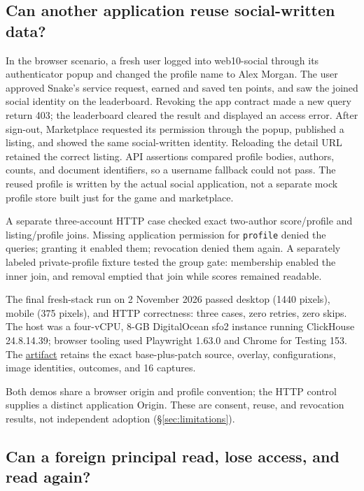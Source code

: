 \documentclass[sigconf, nonacm]{acmart}
\newcommand{\artifactbase}{https://github.com/jacoby149/web10}
\newcommand{\domainartifactrev}{26720acba859c7eb03fc5d26a6221cdde5b764a1}
\newcommand{\evidence}[2]{\href{\artifactbase/tree/\domainartifactrev/#1}{#2}}
\begin{document}
\subsection{Can another application reuse social-written data?}
\label{sec:ev-interop}

In the browser scenario, a fresh user logged into web10-social through
its authenticator popup and changed the profile name to Alex Morgan.
The user approved Snake's service request, earned and saved ten points,
and saw the joined social identity on the leaderboard. Revoking the app
contract made a new query return 403; the leaderboard cleared the result
and displayed an access error. After sign-out, Marketplace requested
its permission through the popup, published a listing, and showed the
same social-written identity. Reloading the detail URL retained the
correct listing. API assertions compared profile bodies, authors, counts,
and document identifiers, so a username fallback could not pass.
The reused profile is written by the actual social application, not a
separate mock profile store built just for the game and marketplace.

A separate three-account HTTP case checked exact two-author score/profile
and listing/profile joins. Missing application permission for
\texttt{profile} denied the queries; granting it enabled them; revocation
denied them again. A separately labeled private-profile fixture tested
the group gate: membership enabled the inner join, and removal emptied
that join while scores remained readable.

The final fresh-stack run on 2 November 2026 passed desktop (1440 pixels),
mobile (375 pixels), and HTTP correctness: three cases, zero retries,
zero skips. The host was a four-vCPU, 8-GB DigitalOcean sfo2 instance
running ClickHouse 24.8.14.39; browser tooling used Playwright 1.63.0 and
Chrome for Testing 153. The \evidence{research/interoperability-demo}{artifact}
retains the exact base-plus-patch source, overlay, configurations, image
identities, outcomes, and 16 captures.

Both demos share a browser origin and profile convention; the HTTP control
supplies a distinct application Origin. These are consent, reuse, and
revocation results, not independent adoption (\S\ref{sec:limitations}).

\subsection{Can a foreign principal read, lose access, and read again?}
\label{sec:ev-network}
\end{document}
